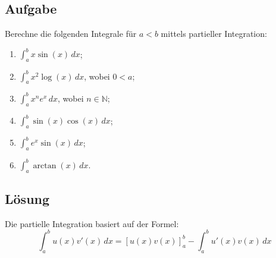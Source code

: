 \documentclass{article}
\begin{document}
\subsection*{Aufgabe}
Berechne die folgenden Integrale für $a<b$ mittels partieller Integration:

\begin{enumerate}[label=(\alph*)]
\item $\int_a^b x\sin(x)\,dx$;
\item $\int_a^b x^2\log(x)\,dx$, wobei $0<a$;
\item $\int_a^b x^n e^x\,dx$, wobei $n\in\mathbb{N}$;
\item $\int_a^b \sin(x)\cos(x)\,dx$;
\item $\int_a^b e^x\sin(x)\,dx$;
\item $\int_a^b \arctan(x)\,dx$.
\end{enumerate}

\subsection*{Lösung}

Die partielle Integration basiert auf der Formel:
$$\int_a^b u(x)v'(x)\,dx = [u(x)v(x)]_a^b - \int_a^b u'(x)v(x)\,dx$$
\end{document}

